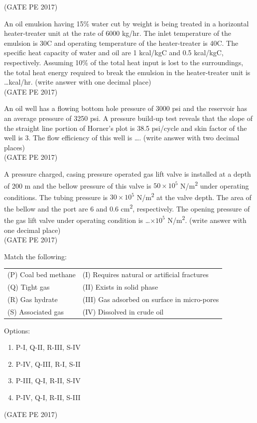 \documentclass[journal,12pt,onecolumn]{IEEEtran}
\theoremstyle{remark}
\begin{document}
\begin{enumerate}
{\hfill{(GATE PE 2017)}

\item An oil emulsion having 15\% water cut by weight is being treated in a horizontal heater-treater unit at the rate of 6000 kg/hr. The inlet temperature of the emulsion is 30\textdegree C and operating temperature of the heater-treater is 40\textdegree C. The specific heat capacity of water and oil are 1 kcal/kg\textdegree C and 0.5 kcal/kg\textdegree C, respectively. Assuming 10\% of the total heat input is lost to the surroundings, the total heat energy required to break the emulsion in the heater-treater unit is \dots kcal/hr. (write answer with one decimal place)\\

\hfill{(GATE PE 2017)}

\item An oil well has a flowing bottom hole pressure of 3000 psi and the reservoir has an average pressure of 3250 psi. A pressure build-up test reveals that the slope of the straight line portion of Horner's plot is 38.5 psi/cycle and skin factor of the well is 3. The flow efficiency of this well is \dots. (write answer with two decimal places)\\

\hfill{(GATE PE 2017)}


\item A pressure charged, casing pressure operated gas lift valve is installed at a depth of 200 m and the bellow pressure of this valve is $50 \times 10^5$ N/m\textsuperscript{2} under operating conditions. The tubing pressure is $30 \times 10^5$ N/m\textsuperscript{2} at the valve depth. The area of the bellow and the port are 6 and 0.6 cm\textsuperscript{2}, respectively. The opening pressure of the gas lift valve under operating condition is \dots $\times 10^5$ N/m\textsuperscript{2}. (write answer with one decimal place)\\

\hfill{(GATE PE 2017)}

\item Match the following:\\

\begin{tabular}{ll}
(P) Coal bed methane & (I) Requires natural or artificial fractures \\
(Q) Tight gas        & (II) Exists in solid phase \\
(R) Gas hydrate      & (III) Gas adsorbed on surface in micro-pores \\
(S) Associated gas   & (IV) Dissolved in crude oil \\
\end{tabular}
Options:
\begin{enumerate}
\item P-I, Q-II, R-III, S-IV  
\item P-IV, Q-III, R-I, S-II  
\item P-III, Q-I, R-II, S-IV  
\item P-IV, Q-I, R-II, S-III  
\end{enumerate}
\hfill{(GATE PE 2017)}

}
\end{enumerate}
\end{document}
